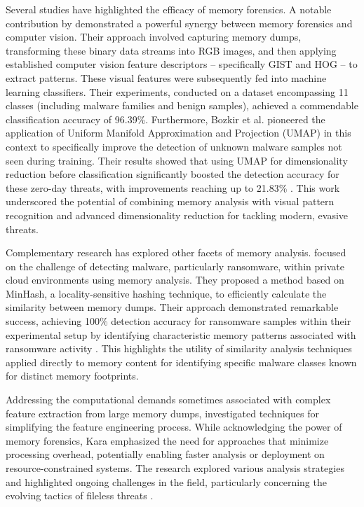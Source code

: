 Several studies have highlighted the efficacy of memory forensics. A notable contribution by \citet{bozkir2021catch} demonstrated a powerful synergy between memory forensics and computer vision. Their approach involved capturing memory dumps, transforming these binary data streams into RGB images, and then applying established computer vision feature descriptors – specifically GIST \cite{oliva2001modeling} and HOG \cite{dalal2005histograms} – to extract patterns. These visual features were subsequently fed into machine learning classifiers. Their experiments, conducted on a dataset encompassing 11 classes (including malware families and benign samples), achieved a commendable classification accuracy of 96.39\%. Furthermore, Bozkir et al. pioneered the application of Uniform Manifold Approximation and Projection (UMAP) \cite{mcinnes2018umap} in this context to specifically improve the detection of unknown malware samples not seen during training. Their results showed that using UMAP for dimensionality reduction before classification significantly boosted the detection accuracy for these zero-day threats, with improvements reaching up to 21.83\% \cite{bozkir2021catch}. This work underscored the potential of combining memory analysis with visual pattern recognition and advanced dimensionality reduction for tackling modern, evasive threats.

Complementary research has explored other facets of memory analysis. \citet{nissim2019volatile} focused on the challenge of detecting malware, particularly ransomware, within private cloud environments using memory analysis. They proposed a method based on MinHash, a locality-sensitive hashing technique, to efficiently calculate the similarity between memory dumps. Their approach demonstrated remarkable success, achieving 100\% detection accuracy for ransomware samples within their experimental setup by identifying characteristic memory patterns associated with ransomware activity \cite{nissim2019volatile}. This highlights the utility of similarity analysis techniques applied directly to memory content for identifying specific malware classes known for distinct memory footprints.

Addressing the computational demands sometimes associated with complex feature extraction from large memory dumps, \citet{kara2022fileless} investigated techniques for simplifying the feature engineering process. While acknowledging the power of memory forensics, Kara emphasized the need for approaches that minimize processing overhead, potentially enabling faster analysis or deployment on resource-constrained systems. The research explored various analysis strategies and highlighted ongoing challenges in the field, particularly concerning the evolving tactics of fileless threats \cite{kara2022fileless}.

